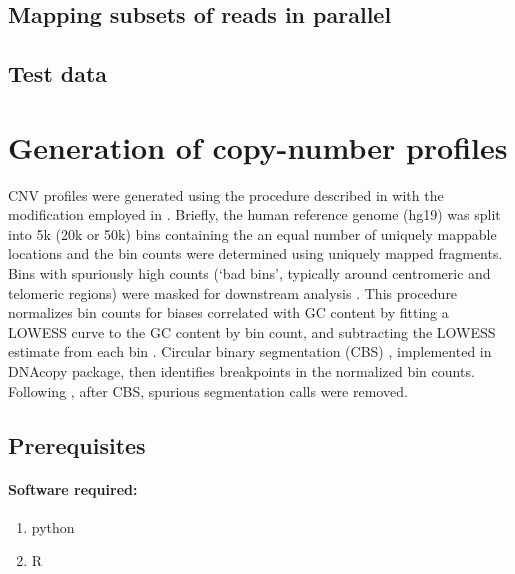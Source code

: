 \documentclass[11pt]{article}
\begin{document}
\subsection{Mapping subsets of reads in parallel}


\subsection{Test data}


\section{Generation of copy-number profiles}
\label{cnv}
CNV profiles were generated using the procedure described in
\cite{baslan2012genome,kendall2014computational} with the
modification employed in
\cite{gerdtsson2018multiplex,malihi2018clonal}.
Briefly, the
human reference genome (hg19) was split into 5k (20k or 50k) bins
containing the an equal number of uniquely mappable locations and
the bin counts were determined using uniquely mapped fragments.
Bins with spuriously high counts (`bad bins', typically around
centromeric and telomeric regions) were masked for
downstream analysis \cite{kendall2014computational}.
This procedure normalizes bin counts for biases correlated with GC
content by fitting a LOWESS curve to the GC content by bin count,
and subtracting the LOWESS estimate from each bin
\cite{kendall2014computational}.
Circular binary segmentation (CBS) {\cite{olshen2004circular}},
implemented in DNAcopy {\cite{seshan2010dnacopy}} package, then
identifies breakpoints in the normalized bin counts.
Following \cite{gerdtsson2018multiplex,malihi2018clonal}, after CBS,
spurious segmentation calls were removed.



\subsection{Prerequisites}
\paragraph{Software required:}
\begin{enumerate}
  \item python
  \item R
\end{enumerate}
\end{document}

